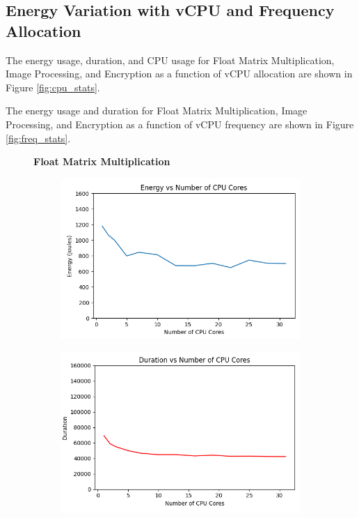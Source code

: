 \documentclass[times, 10pt,twocolumn]{article}
\begin{document}
\subsection{Energy Variation with vCPU and Frequency Allocation}
\label{appendix:energy_variation_vcpu_frequency}
The energy usage, duration, and CPU usage for Float Matrix Multiplication, Image Processing, and Encryption as a function of vCPU allocation are shown in Figure \ref{fig:cpu_stats}. 

The energy usage and duration for Float Matrix Multiplication, Image Processing, and Encryption as a function of vCPU frequency are shown in Figure \ref{fig:freq_stats}. 
\begin{figure}[ht]
   \centering
   \textbf{Float Matrix Multiplication}\par\medskip
   \begin{subfigure}[b]{0.3\textwidth}
     \includegraphics[width=\textwidth]{imgs/study_1_results/var_cpu/floatmatmul/CPU_Energy.png}
     \caption{}
     \label{fig:plot1}
   \end{subfigure}
   \hfill
   \begin{subfigure}[b]{0.3\textwidth}
      \includegraphics[width=\textwidth]{imgs/study_1_results/var_cpu/floatmatmul/CPU_Duration.png}

\end{subfigure}
\end{figure}
\end{document}
